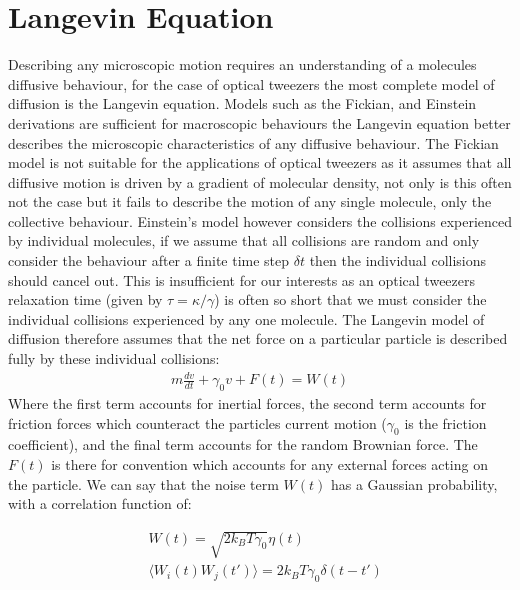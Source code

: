 \section{Langevin Equation}
Describing any microscopic motion requires an understanding of a molecules diffusive behaviour, for the case of optical tweezers the most complete model of diffusion is the Langevin equation. Models such as the Fickian, and Einstein derivations are sufficient for macroscopic behaviours the Langevin equation better describes the microscopic characteristics of any diffusive behaviour. The Fickian model is not suitable for the applications of optical tweezers as it assumes that all diffusive motion is driven by a gradient of molecular density, not only is this often not the case but it fails to describe the motion of any single molecule, only the collective behaviour. Einstein's model however considers the collisions experienced by individual molecules, if we assume that all collisions are random and only consider the behaviour after a finite time step $\delta t$ then the individual collisions should cancel out. This is insufficient for our interests as an optical tweezers relaxation time (given by $\tau = \kappa/\gamma$) is often so short that we must consider the individual collisions experienced by any one molecule. The Langevin model of diffusion therefore assumes that the net force on a particular particle is described fully by these individual collisions:
\begin{align}
	m\frac{dv}{dt} + \gamma_0 v + F(t) = W(t)
\end{align}
Where the first term accounts for inertial forces, the second term accounts for friction forces which counteract the particles current motion ($\gamma_0$ is the friction coefficient), and the final term accounts for the random Brownian force. The $F(t)$ is there for convention which accounts for any external forces acting on the particle. We can say that the noise term $W(t)$ has a Gaussian probability, with a correlation function of:

\begin{align}
	&W(t) = \sqrt{2k_BT\gamma_0}\eta(t) \\
	&\langle W_i(t)W_j(t')\rangle = 2k_BT\gamma_0\delta(t-t')
\end{align}

